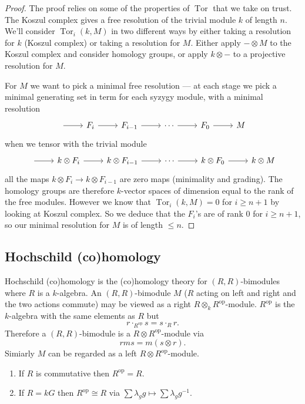 \documentclass[a4paper]{article}
\DeclareMathOperator{\Tor}{Tor}
\newcommand{\op}{\mathrm{op}}
\begin{document}
\begin{proof}
  The proof relies on some of the properties of \(\Tor\) that we take on trust. The Koszul complex gives a free resolution of the trivial module \(k\) of length \(n\). We'll consider \(\Tor_i(k, M)\) in two different ways by either taking a resolution for \(k\) (Koszul complex) or taking a resolution for \(M\). Either apply \(- \otimes M\) to the Koszul complex and consider homology groups, or apply \(k \otimes -\) to a projective resolution for \(M\).

  For \(M\) we want to pick a minimal free resolution --- at each stage we pick a minimal generating set in term for each syzygy module, with a minimal resolution
  \[
    \begin{tikzcd}
      \ar[r] & F_i \ar[r] & F_{i - 1} \ar[r] & \cdots \ar[r] & F_0 \ar[r] & M
    \end{tikzcd}
  \]
  when we tensor with the trivial module
  \[
    \begin{tikzcd}
      \ar[r] & k \otimes F_i \ar[r] & k \otimes F_{i - 1} \ar[r] & \cdots \ar[r] & k \otimes F_0 \ar[r] & k \otimes M
    \end{tikzcd}
  \]
  all the maps \(k \otimes F_i \to k \otimes F_{i - 1}\) are zero maps (minimality and grading). The homology groups are therefore \(k\)-vector spaces of dimension equal to the rank of the free modules. However we know that \(\Tor_i(k, M) = 0\) for \(i \geq n + 1\) by looking at Koszul complex. So we deduce that the \(F_i\)'s are of rank \(0\) for \(i \geq n + 1\), so our minimal resolution for \(M\) is of length \(\leq n\).
\end{proof}

\subsection{Hochschild (co)homology}

Hochschild (co)homology is the (co)homology theory for \((R, R)\)-bimodules where \(R\) is a \(k\)-algebra. An \((R, R)\)-bimodule \(M\) (\(R\) acting on left and right and the two actions commute) may be viewed as a right \(R \otimes_k R^\op\)-module. \(R^\op\) is the \(k\)-algebra with the same elements as \(R\) but
\[
  r \cdot_{R^\op} s = s \cdot_R r.
\]
Therefore a \((R, R)\)-bimodule is a \(R \otimes R^\op\)-module via
\[
  rms = m (s \otimes r).
\]
Simiarly \(M\) can be regarded as a left \(R \otimes R^\op\)-module.

\begin{eg}\leavevmode
  \begin{enumerate}
  \item If \(R\) is commutative then \(R^\op = R\).
  \item If \(R = kG\) then \(R^\op \cong R\) via \(\sum \lambda_g g \mapsto \sum \lambda_g g^{-1}\).
  \end{enumerate}
\end{eg}
\end{document}
